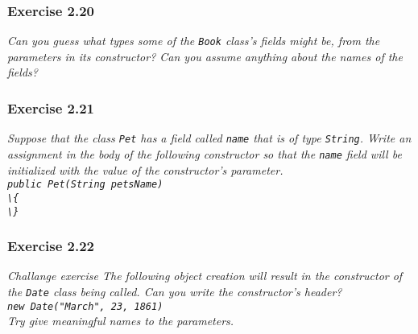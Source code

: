 \subsubsection*{Exercise 2.20}
\textit{Can you guess what types some of the \lstinline{Book} class's fields might 
be, from the parameters in its constructor? Can you assume anything about the 
names of the fields? }

\subsubsection*{Exercise 2.21}
\textit{Suppose that the class \lstinline{Pet} has a field called \lstinline{name} that 
is of type \lstinline{String}. Write an assignment in the body of the following 
constructor so that the \lstinline{name} field will be initialized with the value 
of the constructor's parameter. \\
\lstinline{public Pet(String petsName)}\\
\lstinline!\{!\\
\lstinline!\}!}

\subsubsection*{Exercise 2.22}
\textit{Challange exercise The following object creation will result in the 
constructor of the \lstinline{Date} class being called. Can you write the 
constructor's header? \\
\lstinline{new Date("March", 23, 1861)}\\
Try give meaningful names to the parameters. }

